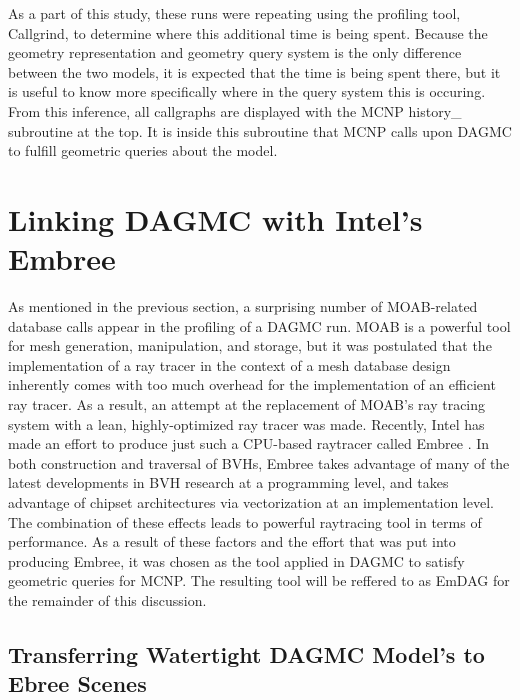 \documentclass[10pt, a4paper]{article}
\begin{document}
As a part of this study, these runs were repeating using the profiling tool, Callgrind, to determine where this additional time is being spent. Because the geometry representation and geometry query system is the only difference between the two models, it is expected that the time is being spent there, but it is useful to know more specifically where in the query system this is occuring. From this inference, all callgraphs are displayed with the MCNP history\_ subroutine at the top. It is inside this subroutine that MCNP calls upon DAGMC to fulfill geometric queries about the model.








\section{Linking DAGMC with Intel's Embree}

As mentioned in the previous section, a surprising number of MOAB-related database calls appear in the profiling of a DAGMC run. MOAB is a powerful tool for mesh generation, manipulation, and storage, but it was postulated that the implementation of a ray tracer in the context of a mesh database design inherently comes with too much overhead for the implementation of an efficient ray tracer. As a result, an attempt at the replacement of MOAB's ray tracing system with a lean, highly-optimized ray tracer was made. Recently, Intel has made an effort to produce just such a CPU-based raytracer called Embree \cite{embree}. In both construction and traversal of BVHs, Embree takes advantage of many of the latest developments in BVH research at a programming level, and takes advantage of chipset architectures via vectorization at an implementation level. The combination of these effects leads to powerful raytracing tool in terms of performance. As a result of these factors and the effort that was put into producing Embree, it was chosen as the tool applied in DAGMC to satisfy geometric queries for MCNP. The resulting tool will be reffered to as EmDAG for the remainder of this discussion.

\subsection{Transferring Watertight DAGMC Model's to Ebree Scenes}
\end{document}
